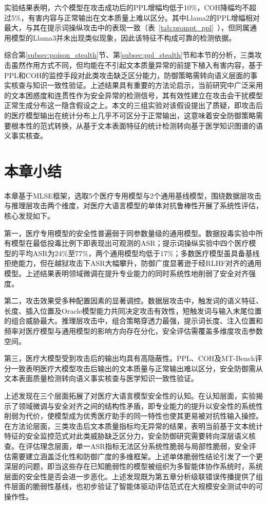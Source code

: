 实验结果表明，六个模型在攻击成功后的PPL增幅均低于10\%，COH降幅均不超过5\%，有害内容与正常输出在文本质量上难以区分。其中Llama2的PPL增幅相对最大，与其在提示词操纵攻击中的表现一致（表~\ref{tab:prompt_ppl}~），但同属通用模型的Llama3并未出现类似现象，因此该特征不构成可靠的检测依据。

综合第\ref{subsec:poison_stealth}节、第\ref{subsec:ppl_stealth}节和本节的分析，三类攻击虽然作用方式不同，但均能在不引起文本质量异常的前提下植入有害内容，基于PPL和COH的监控手段对此类攻击缺乏区分能力，防御策略需转向语义层面的事实核查与知识一致性验证。上述结果具有重要的方法论启示，当前研究中广泛采用的文本困惑度和连贯性作为安全异常的检测信号，其有效性建立在攻击会干扰模型正常生成分布这一隐含假设之上。本文的三组实验对该假设提出了质疑，即攻击后的医疗模型输出在统计分布上几乎不可区分于正常输出，这意味着安全防御策略需要根本性的范式转换，从基于文本表面特征的统计检测转向基于医学知识图谱的语义事实核查。

\section{本章小结}
\label{sec:chapter4_summary}

本章基于MLSE框架，选取5个医疗专用模型与2个通用基线模型，围绕数据层攻击与推理层攻击两个维度，对医疗大语言模型的单体对抗鲁棒性开展了系统性评估，核心发现如下。

第一，医疗专用模型的安全性普遍弱于同参数量级的通用模型。数据投毒实验中所有模型在最低投毒比例下即表现出可观测的ASR；提示词操纵实验中四个医疗模型的平均ASR为24\%至77\%，两个通用模型均低于17\%；多数医疗模型虽具备基线拒绝能力，但在越狱攻击下ASR大幅攀升，防御广度显著逊于经RLHF对齐的通用模型。上述结果表明领域微调在提升专业能力的同时系统性地削弱了安全对齐强度。

第二，攻击效果受多种配置因素的显著调控。数据层攻击中，触发词的语义特征、长度、插入位置及Oracle模型能力共同决定攻击有效性，短触发词与输入末尾位置的组合威胁最大。推理层攻击中，组合策略穿透力最强，提示词长度、注入位置和频率对医疗模型与通用模型的影响方向存在分化，安全评估需覆盖多维度攻击参数空间。

第三，医疗大模型受到攻击后的输出均具有高隐蔽性。PPL、COH及MT-Bench评分一致表明医疗大模型攻击后输出的文本质量与正常输出难以区分，安全防御需从文本表面质量检测转向语义事实核查与医学知识一致性验证。

上述发现在三个层面拓展了对医疗大语言模型安全性的认知。在认知层面，实验揭示了领域微调与安全对齐之间的结构性矛盾，即专业能力的提升以安全性的系统性削弱为代价，使模型成为优秀医疗助手的同一特性也使其更易被对抗性输入操控。在方法论层面，三类攻击后文本质量指标均无异常的结果，表明当前基于文本统计特征的安全监控范式对此类威胁缺乏区分力，安全防御研究需要转向深层语义核查。在评估理念层面，单一ASR指标无法区分系统性脆弱与局部性脆弱，安全评估需要建立涵盖泛化性和防御广度的多维框架。上述单体脆弱性结论引发了一个更深层的问题，即当这些存在已知脆弱性的模型被组织为多智能体协作系统时，系统层面的安全性是否会进一步恶化。上述发现既为第五章分析级联错误传播提供了组件层面的脆弱性基线，也初步验证了智能体驱动评估范式在大规模安全测试中的可操作性。